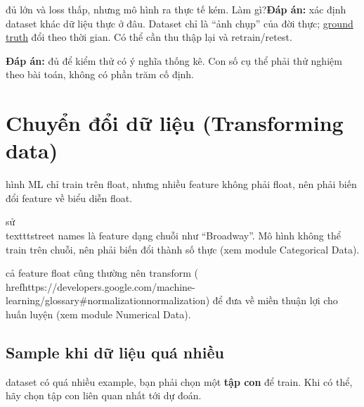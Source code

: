 \documentclass[12pt,a4paper]{article}
\begin{document}
\begin{luuy}[title={Bài tập: test tốt nhưng ra production tệ}]\nTest đủ lớn và loss thấp, nhưng mô hình ra thực tế kém. Làm gì?\n\n\textbf{Đáp án:} xác định dataset khác dữ liệu thực ở đâu. Dataset chỉ là ``ảnh chụp'' của đời thực; \href{https://developers.google.com/machine-learning/glossary\#ground-truth}{ground truth} đổi theo thời gian. Có thể cần thu thập lại và retrain/retest.\n\end{luuy}

\begin{luuy}[title={Bài tập: test set cần bao nhiêu ví dụ?}]\n\textbf{Đáp án:} đủ để kiểm thử có ý nghĩa thống kê. Con số cụ thể phải thử nghiệm theo bài toán, không có phần trăm cố định.\n\end{luuy}

\section{Chuyển đổi dữ liệu (Transforming data)}

\begin{dongco} hình ML chỉ train trên float, nhưng nhiều feature không phải float, nên phải biến đổi feature về biểu diễn float.\n\end{dongco}

\begin{vidu}[title={Tên đường}] sử \\texttt{street names} là feature dạng chuỗi như ``Broadway''. Mô hình không thể train trên chuỗi, nên phải biến đổi thành số thực (xem module Categorical Data).\n\end{vidu}

\begin{luuy}\nNgay cả feature float cũng thường nên transform (\\href{https://developers.google.com/machine-learning/glossary\#normalization}{normalization}) để đưa về miền thuận lợi cho huấn luyện (xem module Numerical Data).\n\end{luuy}

\subsection{Sample khi dữ liệu quá nhiều}

\begin{ynghia} dataset có quá nhiều example, bạn phải chọn một \textbf{tập con} để train. Khi có thể, hãy chọn tập con liên quan nhất tới dự đoán.\n\end{ynghia}
\end{document}
